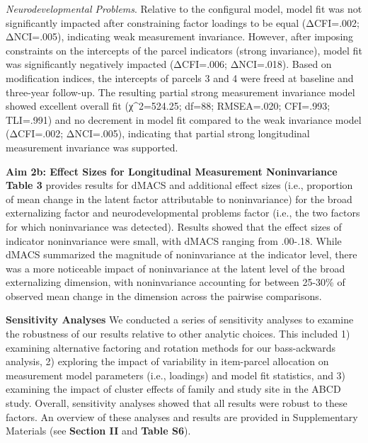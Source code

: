 \documentclass[
  20pt,
  number,
  preprint,
  3p,
  twocolumn]{elsarticle}
\begin{document}
\emph{Neurodevelopmental Problems}. Relative to the configural model,
model fit was not significantly impacted after constraining factor
loadings to be equal (ΔCFI=.002; ΔNCI=.005), indicating weak measurement
invariance. However, after imposing constraints on the intercepts of the
parcel indicators (strong invariance), model fit was significantly
negatively impacted (ΔCFI=.006; ΔNCI=.018). Based on modification
indices, the intercepts of parcels 3 and 4 were freed at baseline and
three-year follow-up. The resulting partial strong measurement
invariance model showed excellent overall fit (χ\^{}2=524.25; df=88;
RMSEA=.020; CFI=.993; TLI=.991) and no decrement in model fit compared
to the weak invariance model (ΔCFI=.002; ΔNCI=.005), indicating that
partial strong longitudinal measurement invariance was supported.

\textbf{Aim 2b: Effect Sizes for Longitudinal Measurement Noninvariance}
\textbf{Table 3} provides results for dMACS and additional effect sizes
(i.e., proportion of mean change in the latent factor attributable to
noninvariance) for the broad externalizing factor and neurodevelopmental
problems factor (i.e., the two factors for which noninvariance was
detected). Results showed that the effect sizes of indicator
noninvariance were small, with dMACS ranging from .00-.18. While dMACS
summarized the magnitude of noninvariance at the indicator level, there
was a more noticeable impact of noninvariance at the latent level of the
broad externalizing dimension, with noninvariance accounting for between
25-30\% of observed mean change in the dimension across the pairwise
comparisons.

\textbf{Sensitivity Analyses} We conducted a series of sensitivity
analyses to examine the robustness of our results relative to other
analytic choices. This included 1) examining alternative factoring and
rotation methods for our bass-ackwards analysis, 2) exploring the impact
of variability in item-parcel allocation on measurement model parameters
(i.e., loadings) and model fit statistics, and 3) examining the impact
of cluster effects of family and study site in the ABCD study. Overall,
sensitivity analyses showed that all results were robust to these
factors. An overview of these analyses and results are provided in
Supplementary Materials (see \textbf{Section II} and \textbf{Table S6}).
\end{document}
